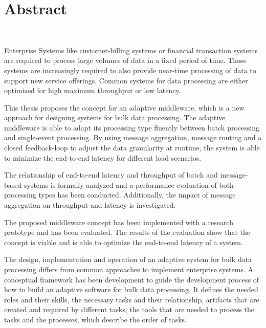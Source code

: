 \begingroup
\let\clearpage\relax
\let\cleardoublepage\relax
\let\cleardoublepage\relax

\chapter*{Abstract}
\begin{center}
\spacedallcaps{\myTitle}\\ \medskip
\spacedlowsmallcaps{\myName} \bigskip
\end{center}
Enterprise Systems like customer-billing systems or financial transaction systems are required to process large volumes of data in a fixed period of time. Those systems are increasingly required to also provide near-time processing of data to support new service offerings. Common systems for data processing are either optimized for high maximum throughput or low latency.

This thesis proposes the concept for an adaptive middleware, which is a new approach for designing systems for bulk data processing. The adaptive middleware is able to adapt its processing type fluently between batch processing and single-event processing. By using message aggregation, message routing and a closed feedback-loop to adjust the data granularity at runtime, the system is able to minimize the end-to-end latency for different load scenarios.

The relationship of end-to-end latency and throughput of batch and message-based systems is formally analyzed and a performance evaluation of both processing types has been conducted. Additionally, the impact of message aggregation on throughput and latency is investigated.

The proposed middleware concept has been implemented with a research prototype and has been evaluated. The results of the evaluation show that the concept is viable and is able to optimize the end-to-end latency of a system. 

The design, implementation and operation of an adaptive system for bulk data processing differs from common approaches to implement enterprise systems. A conceptual framework has been development to guide the development process of how to build an adaptive software for bulk data processing. It defines the needed roles and their skills, the necessary tasks and their relationship, artifacts that are created and required by different tasks, the tools that are needed to process the tasks and the processes, which describe the order of tasks.
\vfill
\endgroup			

\vfill